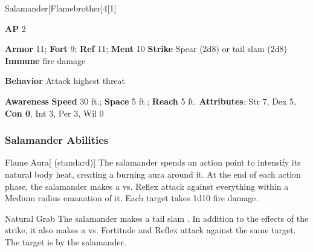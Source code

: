 \begin{monsection}{Salamander}[Flamebrother]{4}[1]
\vspace{-1em}\vspace{-1em}
\begin{spellcontent}
\begin{spelltargetinginfo}
{\textbf{AP} 2}

\pari \textbf{Armor} 11;
\textbf{Fort} 9;
\textbf{Ref} 11;
\textbf{Ment} 10
\pari \textbf{Strike} Spear  (2d8) or tail slam  (2d8)
\pari \textbf{Immune} fire damage


\pari \textbf{Behavior} Attack highest threat
\end{spelltargetinginfo}
\end{spellcontent}

\begin{monsterfooter}
\pari \textbf{Awareness} 
\pari \textbf{Speed} 30 ft.;
\textbf{Space} 5 ft.;
\textbf{Reach} 5 ft.
\pari \textbf{Attributes}:
Str 7,
Dex 5,
\textbf{Con 0},
Int 3,
Per 3,
Wil 0
\end{monsterfooter}
\end{monsection}


\subsubsection{Salamander Abilities}

\begin{ability}{Flame Aura}[ (standard)]
The salamander spends an action point to intensify its natural body heat, creating a burning aura around it.
At the end of each action phase, the salamander makes a  vs. Reflex
attack against everything within a Medium radius emanation of it.
\hit Each target takes 1d10 fire damage.
\end{ability}

\vspace{0.5em}
\begin{ability}{Natural Grab}
The salamander makes a tail slam .
In addition to the effects of the strike, it also makes a  vs. Fortitude and Reflex attack against the same target.
\hit The target is  by the salamander.
\end{ability}

